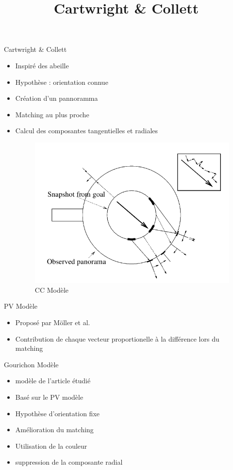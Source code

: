 \documentclass{beamer}
\begin{document}
\begin{frame}
  \title{Cartwright \& Collett}
  \begin{block}{Cartwright \& Collett}
    \begin{itemize}
      \item Inspiré des abeille
      \item Hypothèse : orientation connue
      \item Création d'un pannoramma
      \item Matching au plus proche
      \item Calcul des composantes tangentielles et radiales    
      \begin{figure}
        \centering
        \includegraphics[scale=0.2]{cc_model.png}
        \caption{CC Modèle}
      \end{figure}
    \end{itemize}
  \end{block}
\end{frame}

\begin{frame}
  \begin{block}{PV Modèle}
    \begin{itemize}
      \item Proposé par Möller et al. \cite{TODO}
      \item Contribution de chaque vecteur proportionelle à la différence lors du matching
    \end{itemize}
  \end{block}
  \begin{block}{Gourichon Modèle}
    \begin{itemize}
      \item modèle de l'article étudié
      \item Basé sur le PV modèle
      \item Hypothèse d'orientation fixe
      \item Amélioration du matching
      \item Utilisation de la couleur 
      \item suppression de la composante radial
    \end{itemize}
  \end{block}
\end{frame}
\end{document}
